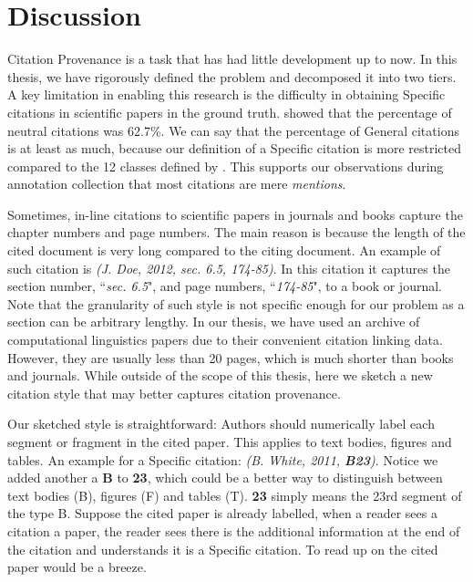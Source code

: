 \chapter{Discussion}
\label{discussion}
Citation Provenance is a task that has had little development up to now. In this thesis, we have rigorously defined the problem and decomposed it into two tiers.  A key limitation in enabling this research is the difficulty in obtaining Specific citations in scientific papers in the ground truth. 
 showed that the percentage of neutral citations was 62.7\%. 
We can say that the percentage of General citations is at least as much, because our definition of a Specific citation is more restricted compared to the 12 classes defined by . This supports our observations during annotation collection that most citations are mere {\it mentions}.

Sometimes, in-line citations to scientific papers in journals and books capture the chapter numbers and page numbers. The main reason is because the length of the cited document is very long compared to the citing document. An example of such citation is \textit{(J. Doe, 2012, sec. 6.5, 174-85)}. In this citation it captures the section number, ``\textit{sec. 6.5}", and page numbers, ``\textit{174-85}", to a book or journal. Note that the granularity of such style is not specific enough for our problem as a section can be arbitrary lengthy. In our thesis, we have used an archive of computational linguistics papers due to their convenient citation linking data.  However, they are usually less than 20 pages, which is much shorter than books and journals.  While outside of the scope of this thesis, here we sketch a new citation style that may better captures citation provenance.

Our sketched style is straightforward: Authors should numerically label each segment or fragment in the cited paper. This applies to text bodies, figures and tables. An example for a Specific citation: \textit{(B. White, 2011, \textbf{B23})}. Notice we added another a \textbf{B} to \textbf{23}, which could be a better way to distinguish between text bodies (B), figures (F) and tables (T). \textbf{23} simply means the 23rd segment of the type B. Suppose the cited paper is already labelled, when a reader sees a citation a paper, the reader sees there is the additional information at the end of the citation and understands it is a Specific citation. To read up on the cited paper would be a breeze.

